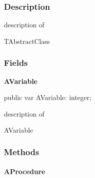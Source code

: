\documentclass{report}
\newif\ifpdf
\begin{document}
\subsubsection*{\large{\textbf{Description}}\normalsize\hspace{1ex}\hfill}
description of \begin{ttfamily}TAbstractClass\end{ttfamily}\subsubsection*{\large{\textbf{Fields}}\normalsize\hspace{1ex}\hfill}
\begin{list}{}{
\setlength{\itemindent}{0cm}
\setlength{\listparindent}{0cm}
\setlength{\leftmargin}{\evensidemargin}
\addtolength{\leftmargin}{\tmplength}
\settowidth{\labelsep}{X}
\addtolength{\leftmargin}{\labelsep}
\setlength{\labelwidth}{\tmplength}
}
\label{ok_abstract_sealed.TAbstractClass-AVariable}
\item[\textbf{AVariable}\hfill]
\ifpdf
\begin{flushleft}
\fi
\begin{ttfamily}
public var AVariable: integer;\end{ttfamily}

\ifpdf
\end{flushleft}
\fi


\par description of \begin{ttfamily}AVariable\end{ttfamily}\end{list}
\subsubsection*{\large{\textbf{Methods}}\normalsize\hspace{1ex}\hfill}
\paragraph*{AProcedure}\hspace*{\fill}
\end{document}
